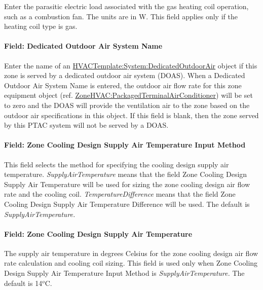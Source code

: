 Enter the parasitic electric load associated with the gas heating coil operation, such as a combustion fan. The units are in W. This field applies only if the heating coil type is gas.

\paragraph{Field: Dedicated Outdoor Air System Name}\label{field-dedicated-outdoor-air-system-name-2}

Enter the name of an \hyperref[hvactemplatesystemdedicatedoutdoorair]{HVACTemplate:System:DedicatedOutdoorAir} object if this zone is served by a dedicated outdoor air system (DOAS). When a Dedicated Outdoor Air System Name is entered, the outdoor air flow rate for this zone equipment object (ref. \hyperref[zonehvacpackagedterminalairconditioner]{ZoneHVAC:PackagedTerminalAirConditioner}) will be set to zero and the DOAS will provide the ventilation air to the zone based on the outdoor air specifications in this object. If this field is blank, then the zone served by this PTAC system will not be served by a DOAS.

\paragraph{Field: Zone Cooling Design Supply Air Temperature Input Method}\label{field-zone-cooling-design-supply-air-temperature-input-method-1}

This field selects the method for specifying the cooling design supply air temperature. \emph{SupplyAirTemperature} means that the field Zone Cooling Design Supply Air Temperature will be used for sizing the zone cooling design air flow rate and the cooling coil. \emph{TemperatureDifference} means that the field Zone Cooling Design Supply Air Temperature Difference will be used. The default is \emph{SupplyAirTemperature.}

\paragraph{Field: Zone Cooling Design Supply Air Temperature}\label{field-zone-cooling-design-supply-air-temperature-000}

The supply air temperature in degrees Celsius for the zone cooling design air flow rate calculation and cooling coil sizing. This field is used only when Zone Cooling Design Supply Air Temperature Input Method is \emph{SupplyAirTemperature.} The default is 14\(^{o}\)C.

